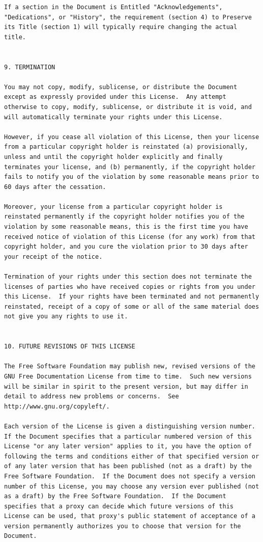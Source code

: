 \documentclass[a4paper]{report}
\begin{document}
\begin{verbatim}
If a section in the Document is Entitled "Acknowledgements",
"Dedications", or "History", the requirement (section 4) to Preserve
its Title (section 1) will typically require changing the actual
title.


9. TERMINATION

You may not copy, modify, sublicense, or distribute the Document
except as expressly provided under this License.  Any attempt
otherwise to copy, modify, sublicense, or distribute it is void, and
will automatically terminate your rights under this License.

However, if you cease all violation of this License, then your license
from a particular copyright holder is reinstated (a) provisionally,
unless and until the copyright holder explicitly and finally
terminates your license, and (b) permanently, if the copyright holder
fails to notify you of the violation by some reasonable means prior to
60 days after the cessation.

Moreover, your license from a particular copyright holder is
reinstated permanently if the copyright holder notifies you of the
violation by some reasonable means, this is the first time you have
received notice of violation of this License (for any work) from that
copyright holder, and you cure the violation prior to 30 days after
your receipt of the notice.

Termination of your rights under this section does not terminate the
licenses of parties who have received copies or rights from you under
this License.  If your rights have been terminated and not permanently
reinstated, receipt of a copy of some or all of the same material does
not give you any rights to use it.


10. FUTURE REVISIONS OF THIS LICENSE

The Free Software Foundation may publish new, revised versions of the
GNU Free Documentation License from time to time.  Such new versions
will be similar in spirit to the present version, but may differ in
detail to address new problems or concerns.  See
http://www.gnu.org/copyleft/.

Each version of the License is given a distinguishing version number.
If the Document specifies that a particular numbered version of this
License "or any later version" applies to it, you have the option of
following the terms and conditions either of that specified version or
of any later version that has been published (not as a draft) by the
Free Software Foundation.  If the Document does not specify a version
number of this License, you may choose any version ever published (not
as a draft) by the Free Software Foundation.  If the Document
specifies that a proxy can decide which future versions of this
License can be used, that proxy's public statement of acceptance of a
version permanently authorizes you to choose that version for the
Document.


\end{verbatim}
\end{document}
